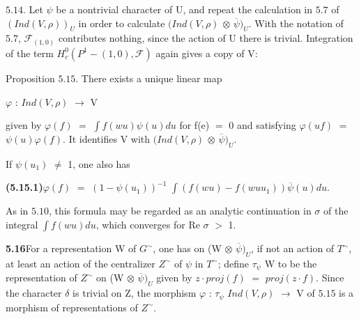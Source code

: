 \documentclass[10pt,a4paper]{article}
\begin{document}
\clearpage
{}
\label{d035-physical-026}
\par $5.14$. Let $\psi{}$ be a nontrivial character of U, and repeat the calculation in $5.7$ of $(Ind(V,\rho{}))_U$ in order to calculate $(Ind(V,\rho{})$ $\otimes{}$ $\overline{\psi{}})_U$. With the notation of $5.7$, $\mathcal{F}_{(1,0)}$ contributes nothing, since the action of U there is trivial. Integration of the term $H_c^0(P^1-{(1,0)},\mathcal{F})$ again gives a copy of V:\par
\par Proposition $5.15$. There exists a unique linear map\par
\par\smallskip\begin{center}\begin{minipage}{0.96\textwidth}\centering
$\varphi{}$ : $Ind(V,\rho{})$ $\to{}$ V
\end{minipage}\end{center}\smallskip
\par given by $\varphi{}(f)$ $=$ $\int{}f(wu)\psi{}(u)du$ for f(e) $=$ 0 and satisfying $\varphi{}(uf)$ $=$ $\psi{}(u)\varphi{}(f)$. It identifies V with $(Ind(V,\rho{})$ $\otimes{}$ $\overline{\psi{}})_U$.\par
\par If $\psi{}(u_1)$ $\ne{}$ 1, one also has\par
\par\noindent\textbf{(5.15.1)}\quad $\varphi{}(f)$ $=$ $(1-\psi{}(u_1))^{-1}$ $\int{}(f(wu)-f(wuu_1))\overline{\psi{}}(u)du$.\par
\par As in $5.10$, this formula may be regarded as an analytic continuation in $\sigma{}$ of the integral $\int{}f(wu)du$, which converges for Re $\sigma{}$ $>$ 1.\par
\par\noindent\textbf{5.16}\quad For a representation W of $G^\sim$, one has on (W $\otimes{}$ $\overline{\psi{}})_U$, if not an action of $T^\sim$, at least an action of the centralizer $Z^\sim$ of $\psi{}$ in $T^\sim$; define $\tau{}_\psi{}$ W to be the representation of $Z^\sim$ on (W $\otimes{}$ $\overline{\psi{}})_U$ given by $z\cdot{}proj(f)$ $=$ $proj(z\cdot{}f)$. Since the character $\delta{}$ is trivial on Z, the morphism $\varphi{}$ : $\tau{}_\psi{}$ $Ind(V,\rho{})$ $\to{}$ V of $5.15$ is a morphism of representations of $Z^\sim$.\par
\end{document}
